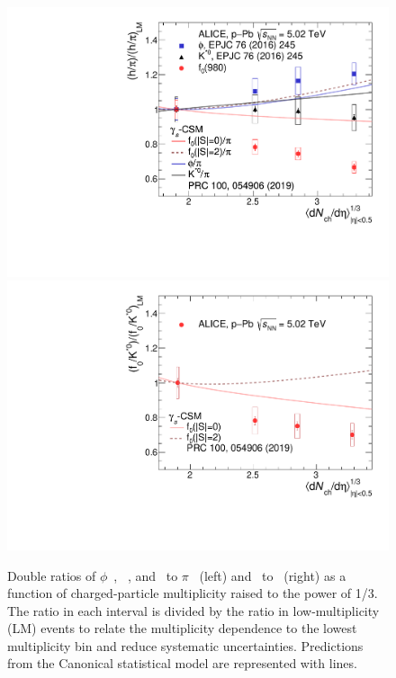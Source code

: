 \begin{figure}[!hbt]
	\centering
	\includegraphics[width=0.49 \textwidth]{figures/Fig4_dr_pion_addCSM_addpar.pdf} 
        \includegraphics[width=0.49 \textwidth]{figures/Fig4_dr_kstar_addCSM.pdf} 
	\caption{ Double ratios of $\phi$~\cite{ALICE:2016sak}, \kstar~\cite{ALICE:2016sak}, and \fzero~to $\pi$~\cite{ALICE:2016dei} (left) and \fzero~to \kstar~(right) as a function of charged-particle multiplicity raised to the power of 1/3. The ratio in each interval is divided by the ratio in low-multiplicity (LM) events to relate the multiplicity dependence to the lowest multiplicity bin and reduce systematic uncertainties. Predictions from the Canonical statistical model are represented with lines. }
	\label{fig:f0piAddCSM}
\end{figure}


